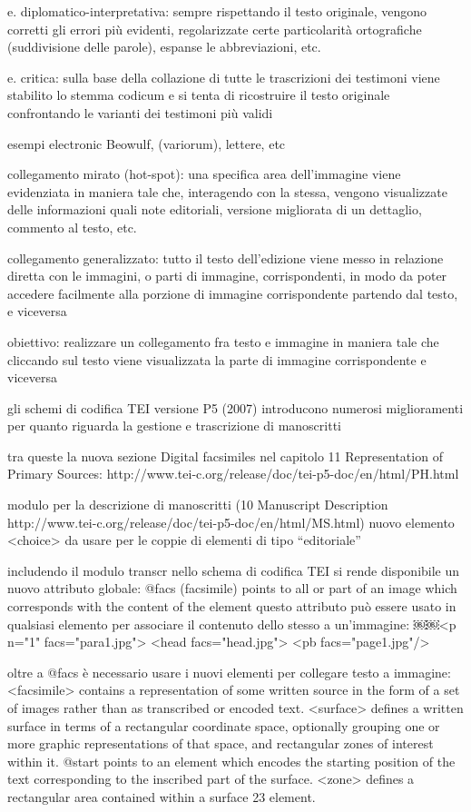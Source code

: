 e. diplomatico-interpretativa: sempre rispettando il testo originale, vengono corretti gli errori più evidenti, regolarizzate certe particolarità ortografiche (suddivisione delle parole), espanse le abbreviazioni, etc.

e. critica: sulla base della collazione di tutte le trascrizioni
dei testimoni viene stabilito lo stemma codicum e si tenta
di ricostruire il testo originale confrontando le varianti dei
testimoni più validi

esempi electronic Beowulf, (variorum), lettere, etc

collegamento mirato (hot-spot): una specifica area dell’immagine viene evidenziata in maniera tale che, interagendo con la stessa, vengono visualizzate delle informazioni quali note editoriali, versione migliorata di un dettaglio, commento al testo, etc.

collegamento generalizzato: tutto il testo dell’edizione viene messo in relazione diretta con le immagini, o parti di immagine, corrispondenti, in modo da poter accedere facilmente alla porzione di immagine corrispondente partendo dal testo, e viceversa

obiettivo: realizzare un collegamento fra testo e immagine in maniera tale che cliccando sul testo viene visualizzata la parte di immagine corrispondente e viceversa

gli schemi di codifica TEI versione P5 (2007) introducono numerosi miglioramenti per quanto riguarda la gestione e trascrizione di manoscritti

tra queste la nuova sezione Digital facsimiles nel capitolo 11 Representation of Primary Sources:
http://www.tei-c.org/release/doc/tei-p5-doc/en/html/PH.html

modulo per la descrizione di manoscritti (10 Manuscript
Description http://www.tei-c.org/release/doc/tei-p5-doc/en/html/MS.html)
nuovo elemento <choice> da usare per le coppie di elementi
di tipo “editoriale”

includendo il modulo transcr nello schema di codifica TEI si rende disponibile un nuovo attributo globale:
@facs (facsimile) points to all or part of an image which corresponds with the content of the element
questo attributo può essere usato in qualsiasi elemento per associare il contenuto dello stesso a un’immagine:
￼￼<p n="1" facs="para1.jpg">
<head facs="head.jpg">
<pb facs="page1.jpg"/>

oltre a @facs è necessario usare i nuovi elementi per collegare testo a immagine:
<facsimile> contains a representation of some written source in the form of a set of images rather than as transcribed or encoded text.
<surface> defines a written surface in terms of a rectangular coordinate space, optionally grouping one or more graphic representations of that space, and rectangular zones of interest within it.
@start points to an element which encodes the starting position of the text corresponding to the inscribed part of the surface.
<zone> defines a rectangular area contained within a surface 23 element.

